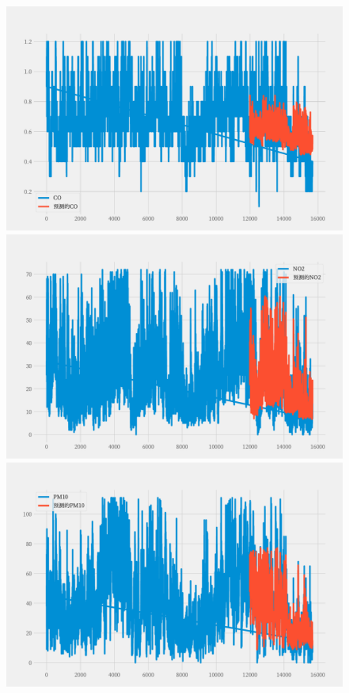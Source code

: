 \documentclass[a4paper,10pt]{my_paper}
\numberwithin{equation}{section}
\begin{document}
\begin{figure}[htbp]
	\centering
		\begin{minipage}[c]{0.3\textwidth} %
			\centering
			\includegraphics[width=1\textwidth]{prob4/预测A3地_CO.pdf} %
		\end{minipage}%
		\begin{minipage}[c]{0.3\textwidth}
			\centering
			\includegraphics[width=1\textwidth]{prob4/预测A3地_NO2.pdf}
		\end{minipage}
		\begin{minipage}[c]{0.3\textwidth}
			\centering
			\includegraphics[width=1\textwidth]{prob4/预测A3地_PM10.pdf}

\end{minipage}
\end{figure}
\end{document}
